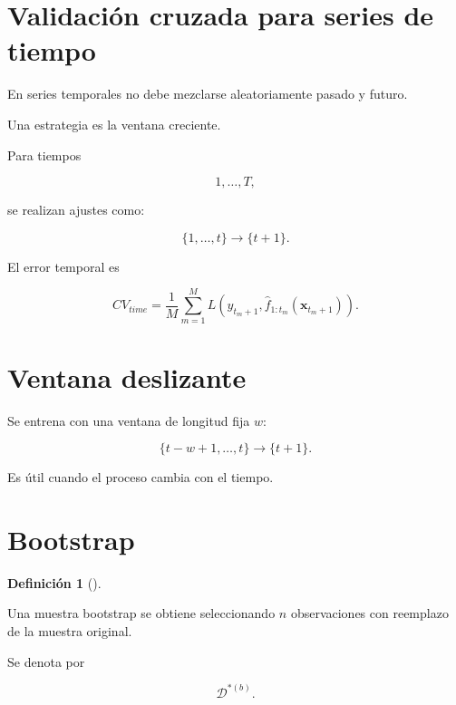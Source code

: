 \documentclass[
  spanish,
  10.5pt,
  letterpaper,
  DIV=11,
  numbers=noendperiod,
  oneside,
  open=any]{scrreprt}
\theoremstyle{definition}
\newtheorem{definition}{Definición}[chapter]
\theoremstyle{definition}
\theoremstyle{plain}
\theoremstyle{remark}
\begin{document}
\section*{Validación cruzada para series de
tiempo}\label{validaciuxf3n-cruzada-para-series-de-tiempo}


En series temporales no debe mezclarse aleatoriamente pasado y futuro.

Una estrategia es la ventana creciente.

Para tiempos

\[
1,\ldots,T,
\]

se realizan ajustes como:

\[
\{1,\ldots,t\}
\to
\{t+1\}.
\]

El error temporal es

\[
CV_{time}
=
\frac{1}{M}
\sum_{m=1}^{M}
L
\left(
y_{t_m+1},
\widehat{f}_{1:t_m}(\mathbf{x}_{t_m+1})
\right).
\]

\section*{Ventana deslizante}\label{ventana-deslizante}


Se entrena con una ventana de longitud fija \(w\):

\[
\{t-w+1,\ldots,t\}
\to
\{t+1\}.
\]

Es útil cuando el proceso cambia con el tiempo.

\section*{Bootstrap}\label{bootstrap}


\begin{definition}[]\protect\hypertarget{def-bootstrap}{}\label{def-bootstrap}

Una muestra bootstrap se obtiene seleccionando \(n\) observaciones con
reemplazo de la muestra original.

\end{definition}

Se denota por

\[
\mathcal{D}^{*(b)}.
\]
\end{document}
